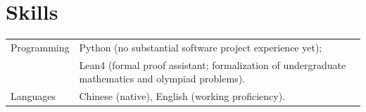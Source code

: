 \documentclass[11pt,a4paper]{ctexart}
\begin{document}
\section{Skills}
\begin{tabularx}{\textwidth}{L{1.2in}Y}
Programming &
Python (no substantial software project experience yet);\\ &Lean4 (formal proof assistant; formalization of undergraduate mathematics and olympiad problems). \\[0.15em]


Languages &
Chinese (native), English (working proficiency). \\
\end{tabularx}
\end{document}
